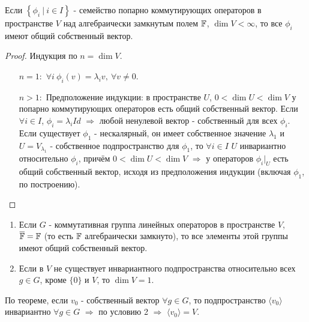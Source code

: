 \begin{theorem}
    Если $\left\{\phi_i \ | \ i \in I\right\}$ - семейство попарно коммутирующих операторов в пространстве $V$ над алгебраически замкнутым полем $\mathbb{F}$, $\dim{V} < \infty$, то все $\phi_i$ имеют общий собственный вектор.
\end{theorem} 
\begin{proof}
    Индукция по $n = \dim{V}$.
    \begin{itemize}
        \item[ $n = 1:$ ] $\forall i \ \phi_i(v) = \lambda_i v, \ \forall v \neq 0.$
        \item[ $n > 1:$ ] Предположение индукции: в пространстве $U$, $0 < \dim{U} < \dim{V}$ у попарно коммутирующих операторов есть общий собственный вектор. Если $\forall i \in I$, $\phi_i = \lambda_i Id$ $\Longrightarrow$ любой ненулевой вектор - собственный для всех $\phi_i$.\\
        Если существует $\phi_1$ - нескалярный, он имеет собственное значение $\lambda_1$ и $U = V_{\lambda_1}$ - собственное подпространство для $\phi_1$, то $\forall i \in I$ $U$ инвариантно относительно $\phi_i$, причём $0 < \dim{U} < \dim{V}$ $\Longrightarrow$ у операторов $\phi_i |_U$ есть общий собственный вектор, исходя из предположения индукции (включая $\phi_1$, по построению).
    \end{itemize}
\end{proof} 
\begin{consequense}\tab
    \begin{enumerate}
        \item Если $G$ - коммутативная группа линейных операторов в пространстве $V$, $\overline{\mathbb{F}} = \mathbb{F}$ (то есть $\mathbb{F}$ алгебраически замкнуто), то все элементы этой группы имеют общий собственный вектор.
        \item Если в $V$ не существует инвариантного подпространства относительно всех $g \in G$, кроме $\{0\}$ и $V$, то $\dim{V} = 1$.
    \end{enumerate}
\end{consequense}
По теореме, если $v_0$ - собственный вектор $\forall g \in G$, то подпространство $\langle v_0 \rangle$ инвариантно $\forall g \in G$ $\Longrightarrow$ по условию 2 $\Longrightarrow$ $\langle v_0 \rangle = V$.

